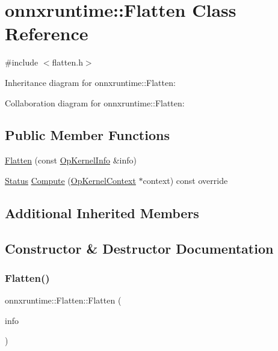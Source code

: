 \hypertarget{classonnxruntime_1_1Flatten}{}\section{onnxruntime\+:\+:Flatten Class Reference}
\label{classonnxruntime_1_1Flatten}


{\ttfamily \#include $<$flatten.\+h$>$}



Inheritance diagram for onnxruntime\+:\+:Flatten\+:


Collaboration diagram for onnxruntime\+:\+:Flatten\+:
\subsection*{Public Member Functions}
\begin{DoxyCompactItemize}
\item 
\mbox{\hyperlink{classonnxruntime_1_1Flatten_a58b05a42f2a0b134f0d9925a3ee9a65c}{Flatten}} (const \mbox{\hyperlink{classonnxruntime_1_1OpKernelInfo}{Op\+Kernel\+Info}} \&info)
\item 
\mbox{\hyperlink{classonnxruntime_1_1common_1_1Status}{Status}} \mbox{\hyperlink{classonnxruntime_1_1Flatten_a1e6a6099556acf9bdb3af019fdca96e2}{Compute}} (\mbox{\hyperlink{classonnxruntime_1_1OpKernelContext}{Op\+Kernel\+Context}} $\ast$context) const override
\end{DoxyCompactItemize}
\subsection*{Additional Inherited Members}


\subsection{Constructor \& Destructor Documentation}
\mbox{\label{classonnxruntime_1_1Flatten_a58b05a42f2a0b134f0d9925a3ee9a65c}} 
\subsubsection{\texorpdfstring{Flatten()}{Flatten()}}
{\footnotesize\ttfamily onnxruntime\+::\+Flatten\+::\+Flatten (\begin{DoxyParamCaption}\item[{const \mbox{\hyperlink{classonnxruntime_1_1OpKernelInfo}{Op\+Kernel\+Info}} \&}]{info }\end{DoxyParamCaption})\hspace{0.3cm}{\ttfamily [inline]}}




